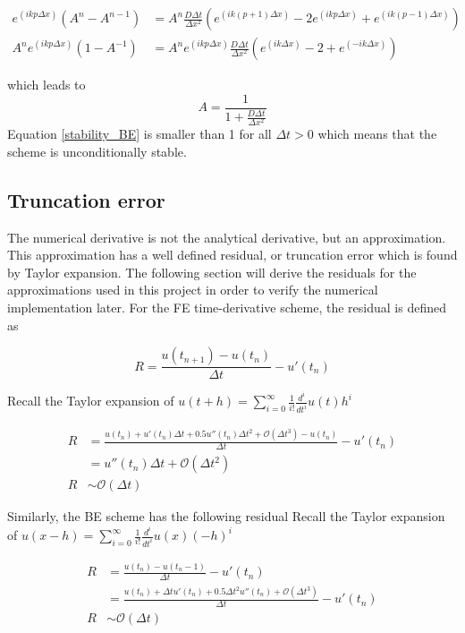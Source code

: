 \begin{align*}
 e^{(ikp\Delta x)}\left(A^{n}-A^{n-1}\right) &=  A^n\frac{D\Delta t}{\Delta x^2}\left(e^{(ik(p+1)\Delta x)}-2e^{(ikp\Delta x)} +e^{(ik(p-1)\Delta x)}\right)\\
  A^n e^{(ikp\Delta x)}\left(1-A^{-1}\right) &=  A^n e^{(ikp\Delta x)}\frac{D\Delta t}{\Delta x^2}\left(e^{(ik\Delta x)} -2 + e^{(-ik\Delta x)}\right)
\end{align*}

which leads to 
\begin{equation}\label{stability_BE}
A = \frac{1}{ 1+\frac{D\Delta t}{\Delta x^2}}
\end{equation}
Equation \ref{stability_BE} is smaller than 1 for all $\Delta t>0$ which means that the scheme is unconditionally stable.

\subsection{Truncation error}\label{truncation_error}

The numerical derivative is not the analytical derivative, but an approximation. 
This approximation has a well defined residual, or truncation error which is found by Taylor expansion. 
The following section will derive the residuals for the approximations used in this project in order to verify the numerical implementation later. 
For the FE time-derivative scheme, the residual is defined as

\begin{equation*}
  R = \frac{u(t_{n+1}) -u(t_n)}{\Delta t} -u'(t_n)
\end{equation*}

Recall the Taylor expansion of $u(t+h) = \sum\limits_{i=0}^\infty\frac{1}{i!}\frac{d^i}{dt^i}u(t)h^i$

\begin{align*}
 R &= \frac{u(t_n)+u'(t_n)\Delta t +0.5u''(t_n)\Delta t^2 + \mathcal{O}(\Delta t^3)-u(t_n)}{\Delta t} -u'(t_n)\\
  &= u''(t_n)\Delta t+ \mathcal{O}(\Delta t^2) \\
  R &\sim \mathcal{O}(\Delta t)
\end{align*}

Similarly, the BE scheme has the following residual
Recall the Taylor expansion of $u(x-h) = \sum\limits_{i=0}^\infty\frac{1}{i!}\frac{d^i}{dt^i}u(x)(-h)^i$

\begin{align*}
  R &= \frac{u(t_{n}) -u(t_n-1)}{\Delta t} -u'(t_n) \\
  &= \frac{u(t_{n}) + \Delta t u'(t_n) + 0.5\Delta t^2 u''(t_n) +\mathcal{O}(\Delta t^3)}{\Delta t}-u'(t_n)\\
  R&\sim \mathcal{O}(\Delta t)
\end{align*}

